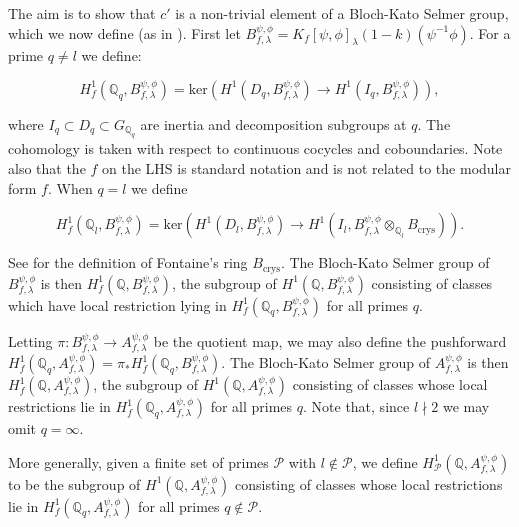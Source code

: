 \documentclass{amsart}
\theoremstyle{plain}
\theoremstyle{definition}
\begin{document}
The aim is to show that $c'$ is a non-trivial element of a Bloch-Kato Selmer group, which we now define (as in \cite[\S 3]{bloch_kato_2007}). First let $B_{f,\lambda}^{\psi,\phi} = K_f[\psi,\phi]_{\lambda}(1-k)(\psi^{-1}\phi)$. For a prime $q \neq l$ we define:

    \[H^1_f(\mathbb{Q}_q, B_{f,\lambda}^{\psi,\phi}) = \text{ker}(H^1(D_q, B_{f,\lambda}^{\psi,\phi})
    \longrightarrow H^1(I_q, B_{f,\lambda}^{\psi,\phi})),\]

\noindent where $I_q\subset D_q\subset G_{\mathbb{Q}_q}$ are inertia and decomposition subgroups at $q$. The cohomology is taken with respect to continuous cocycles and coboundaries. Note also that the $f$ on the LHS is standard notation and is not related to the modular form $f$. When $q=l$ we define

    \[H^1_f(\mathbb{Q}_l, B_{f,\lambda}^{\psi,\phi}) = \text{ker}(H^1(D_l, B_{f,\lambda}^{\psi,\phi}) \longrightarrow H^1(I_l, B_{f,\lambda}^{\psi,\phi} \otimes_{\mathbb{Q}_l} B_{\text{crys}} )).\]

\noindent See \cite[\S 1]{bloch_kato_2007} for the definition of Fontaine's ring $B_{\text{crys}}$. The Bloch-Kato Selmer group of $B_{f,\lambda}^{\psi,\phi}$ is then $H^1_f(\mathbb{Q}, B_{f,\lambda}^{\psi,\phi})$, the subgroup of $H^1(\mathbb{Q}, B_{f,\lambda}^{\psi,\phi})$ consisting of classes which have local restriction lying in $H^1_f(\mathbb{Q}_q, B_{f,\lambda}^{\psi,\phi})$ for all primes $q$. 

Letting $\pi: B_{f,\lambda}^{\psi,\phi} \longrightarrow A_{f,\lambda}^{\psi,\phi}$ be the quotient map, we may also define the pushforward $H^1_f(\mathbb{Q}_q, A_{f,\lambda}^{\psi,\phi}) = \pi_*H^1_f(\mathbb{Q}_q,B_{f,\lambda}^{\psi,\phi})$. The Bloch-Kato Selmer group of $A_{f,\lambda}^{\psi,\phi}$ is then $H^1_f(\mathbb{Q}, A_{f,\lambda}^{\psi,\phi})$, the subgroup of $H^1(\mathbb{Q}, A_{f,\lambda}^{\psi,\phi})$ consisting of classes whose local restrictions lie in $H^1_f(\mathbb{Q}_q, A_{f,\lambda}^{\psi,\phi})$ for all primes $q$. Note that, since $l \nmid 2$ we may omit $q=\infty$. 

More generally, given a finite set of primes $\mathcal{P}$ with $l \notin \mathcal{P}$, we define $H^1_\mathcal{P}(\mathbb{Q}, A_{f,\lambda}^{\psi,\phi})$ to be the subgroup of  $H^1(\mathbb{Q}, A_{f,\lambda}^{\psi,\phi})$ consisting of classes whose local restrictions lie in $H^1_f(\mathbb{Q}_q, A_{f,\lambda}^{\psi,\phi})$ for all primes $q \notin \mathcal{P}$.
\end{document}
